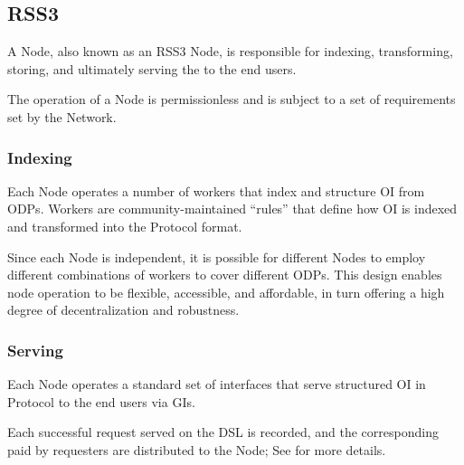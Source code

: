 \subsection{RSS3 }
\label{subsec:SN}

A \gls{Node}, also known as an RSS3 Node, is responsible for indexing, transforming, storing, and ultimately serving the  to the end users.

The operation of a \gls{Node} is permissionless and is subject to a set of requirements set by the Network.

\subsubsection{Indexing}
Each \gls{Node} operates a number of workers that index and structure \gls{OI} from \glspl{ODP}.
Workers are community-maintained ``rules'' that define how \gls{OI} is indexed and transformed into the \gls{Protocol} format.

Since each \gls{Node} is independent, it is possible for different \glspl{Node} to employ different combinations of workers to cover different \glspl{ODP}.
This design enables node operation to be flexible, accessible, and affordable, in turn offering a high degree of decentralization and robustness.

\subsubsection{Serving}
Each \gls{Node} operates a standard set of interfaces that serve structured \gls{OI} in \gls{Protocol} to the end users via \glspl{GI}.

Each successful request served on the \gls{DSL} is recorded, and the corresponding  paid by requesters are distributed to the \gls{Node};
See  for more details.
